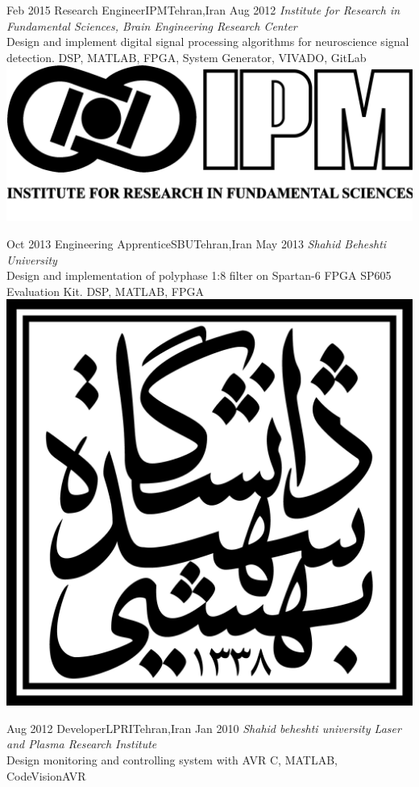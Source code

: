 \begin{experiences}
  \experience
  {Feb 2015} {Research Engineer}{IPM}{Tehran,Iran}
  {Aug 2012} {
    \emph{Institute for Research in Fundamental Sciences, Brain Engineering Research Center}\\
    Design and implement digital signal processing algorithms for neuroscience signal detection.
  }
  {DSP, MATLAB, FPGA, System Generator, VIVADO, GitLab}
  {\includegraphics[scale=0.025]{graphics/IPM_logo}}

  \emptySeparator

  \experience
  {Oct 2013} {Engineering Apprentice}{SBU}{Tehran,Iran}
  {May 2013} {
    \emph{Shahid Beheshti University}\\
    Design and implementation of polyphase 1:8 filter on Spartan-6 FPGA SP605 Evaluation Kit.
  }
  {DSP, MATLAB, FPGA}
  {\includegraphics[scale=0.05]{graphics/SBU_logo}}

  \emptySeparator

  \experience
  {Aug 2012} {Developer}{LPRI}{Tehran,Iran}
  {Jan 2010} {
    \emph{Shahid beheshti university Laser and Plasma Research Institute}\\
    Design  monitoring and controlling system with AVR
  }
  {C, MATLAB, CodeVisionAVR}
  {}
\end{experiences}
